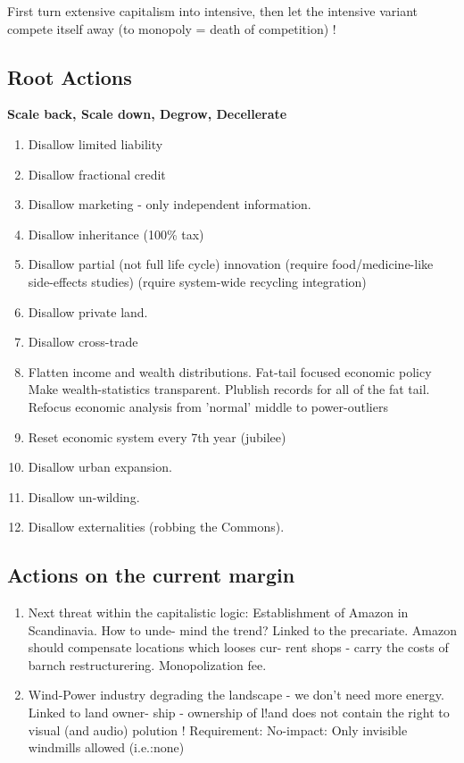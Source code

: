 \documentclass[
]{book}
\providecommand{\tightlist}{%
  \setlength{\itemsep}{0pt}\setlength{\parskip}{0pt}}
\begin{document}
First turn extensive capitalism into intensive,
then let the intensive variant compete itself away (to monopoly = death of competition) !

\hypertarget{root-actions}{%
\subsection{Root Actions}\label{root-actions}}

\textbf{Scale back, Scale down, Degrow, Decellerate}

\begin{enumerate}
\def\labelenumi{(\arabic{enumi})}
\tightlist
\item
  Disallow limited liability
\item
  Disallow fractional credit
\item
  Disallow marketing - only independent information.
\item
  Disallow inheritance (100\% tax)
\item
  Disallow partial (not full life cycle) innovation
  (require food/medicine-like side-effects studies) (rquire system-wide recycling integration)
\item
  Disallow private land.
\item
  Disallow cross-trade
\item
  Flatten income and wealth distributions.
  Fat-tail focused economic policy Make wealth-statistics transparent. Plublish records for all of the
  fat tail. Refocus economic analysis from 'normal' middle to power-outliers
\item
  Reset economic system every 7th year (jubilee)
\item
  Disallow urban expansion.
\item
  Disallow un-wilding.
\item
  Disallow externalities (robbing the Commons).
\end{enumerate}

\hypertarget{actions-on-the-current-margin}{%
\subsection{Actions on the current margin}\label{actions-on-the-current-margin}}

\begin{enumerate}
\def\labelenumi{(\arabic{enumi})}
\item
  Next threat within the capitalistic logic: Establishment of Amazon in Scandinavia. How to unde-
  mind the trend? Linked to the precariate. Amazon should compensate locations which looses cur-
  rent shops - carry the costs of barnch restructurering. Monopolization fee.
\item
  Wind-Power industry degrading the landscape - we don't need more energy. Linked to land owner-
  ship - ownership of l!and does not contain the right to visual (and audio) polution ! Requirement:
  No-impact: Only invisible windmills allowed (i.e.:none)
\end{enumerate}
\end{document}
